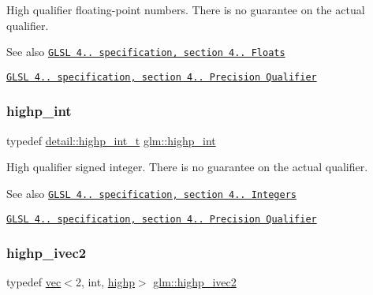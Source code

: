 High qualifier floating-\/point numbers. There is no guarantee on the actual qualifier.

\begin{DoxySeeAlso}{See also}
\href{http://www.opengl.org/registry/doc/GLSLangSpec.4.20.8.pdf}{\tt G\+L\+SL 4.. specification, section 4.. Floats} 

\href{http://www.opengl.org/registry/doc/GLSLangSpec.4.20.8.pdf}{\tt G\+L\+SL 4.. specification, section 4.. Precision Qualifier} 
\end{DoxySeeAlso}
\mbox{\label{group__core__precision_gaafed5240eb0a43328cb75faf5fb0a8c2}} 
\subsubsection{\texorpdfstring{highp\+\_\+int}{highp\_int}}
{\footnotesize\ttfamily typedef \mbox{\hyperlink{namespaceglm_1_1detail_a74c48e9deafcc33db998a4ee62da8d6e}{detail\+::highp\+\_\+int\+\_\+t}} \mbox{\hyperlink{group__core__precision_gaafed5240eb0a43328cb75faf5fb0a8c2}{glm\+::highp\+\_\+int}}}

High qualifier signed integer. There is no guarantee on the actual qualifier.

\begin{DoxySeeAlso}{See also}
\href{http://www.opengl.org/registry/doc/GLSLangSpec.4.20.8.pdf}{\tt G\+L\+SL 4.. specification, section 4.. Integers} 

\href{http://www.opengl.org/registry/doc/GLSLangSpec.4.20.8.pdf}{\tt G\+L\+SL 4.. specification, section 4.. Precision Qualifier} 
\end{DoxySeeAlso}
\mbox{\label{group__core__precision_gad2b0693752b92e6644be9f1c3e50a451}} 
\subsubsection{\texorpdfstring{highp\+\_\+ivec2}{highp\_ivec2}}
{\footnotesize\ttfamily typedef \mbox{\hyperlink{structglm_1_1vec}{vec}}$<$2, int, \mbox{\hyperlink{namespaceglm_a36ed105b07c7746804d7fdc7cc90ff25ac6f7eab42eacbb10d59a58e95e362074}{highp}}$>$ \mbox{\hyperlink{group__core__precision_gad2b0693752b92e6644be9f1c3e50a451}{glm\+::highp\+\_\+ivec2}}}

